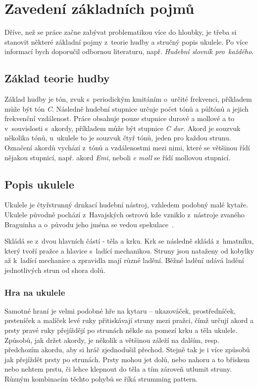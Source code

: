 \chapter{Zavedení základních pojmů}
\label{ch:glosary}
Dříve, než se práce začne zabývat problematikou více do hloubky, je třeba si stanovit některé základní pojmy z~teorie hudby a stručný popis ukulele. Po více informací bych doporučil odbornou literaturu, např. \emph{Hudební slovník pro~každého}\cite{jirivyslouzil_1995_hudebni}.

\section{Základ teorie hudby}
Základ hudby je tón, zvuk s~periodickým kmitáním o~určité frekvenci, příkladem může být tón \emph{C}. Následně hudební stupnice určuje počet tónů a půltónů a jejich frekvenční vzdálenost. Práce obsahuje pouze stupnice durové a mollové a to v~souvislosti s~akordy, příkladem může být stupnice \emph{C dur}. Akord je souzvuk několika tónů, u~ukulele to je souzvuk čtyř tónů, jeden pro každou strunu. Označení akordů vychází z~tónů a vzdálenostmi mezi nimi, které se většinou řídí nějakou stupnicí, např. akord \emph{Emi}, neboli \emph{e moll} se řídí mollovou stupnicí.\cite{jirivyslouzil_1995_hudebni}

\section{Popis ukulele}
\label{sc:ukulele_description}
Ukulele je čtyřstrunný drnkací hudební nástroj, vzhledem podobný malé kytaře. Ukulele původně pochází z~Havajských ostrovů kde vzniklo z~nástroje zvaného Braguinha a o~původu jeho jména se vedou spekulace~\cite{rek_2008_kola}.

Skládá se z~dvou hlavních částí - těla a krku. Krk se následně skládá z~hmatníku, který tvoří pražce a hlavice s~ladící mechanikou. Struny jsou nataženy od kobylky až k~ladící mechanice a zpravidla mají různé ladění. Běžné ladění udává ladění jednotlivých strun od shora dolů.

\subsection{Hra na ukulele}
Samotné hraní je velmi podobné hře na kytaru –⁠ ukazováček, prostředníček, prsteníček a malíček levé ruky přitiskávají struny mezi pražci, čímž určují akord a prsty pravé ruky přejíždějí po strunách někde na pomezí krku a těla ukulele. Způsobů, jak držet akordy, je několik a většinou záleží na dalším, resp. předchozím akordu, aby si hráč zjednodušil přechod. Stejně tak je i více způsobů jak přejíždět prsty po strunách. Prsty mohou jet dolů, nebo nahoru a to břískem nebo nehtem prstu, či lehce klepnout do těla a tím zároveň utlumit struny\cite{rek_2008_kola}. Různým kombinacím těchto pohybů se říká strumming pattern.


